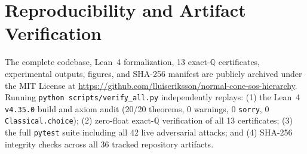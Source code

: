\documentclass[11pt,a4paper]{article}
\newcommand{\QQ}{\mathbb{Q}}
\begin{document}
\section*{Reproducibility and Artifact Verification}
The complete codebase, Lean~4 formalization, 13 exact-$\QQ$ certificates, experimental outputs, figures, and SHA-256 manifest are publicly archived under the MIT License at \url{https://github.com/lluiseriksson/normal-cone-sos-hierarchy}.
Running \texttt{python scripts/verify\_all.py} independently replays: (1) the Lean~4 \texttt{v4.35.0} build and axiom audit (20/20 theorems, 0 warnings, 0 \texttt{sorry}, 0 \texttt{Classical.choice}); (2) zero-float exact-$\QQ$ verification of all 13 certificates; (3) the full \texttt{pytest} suite including all 42 live adversarial attacks; and (4) SHA-256 integrity checks across all 36 tracked repository artifacts.



\end{document}
